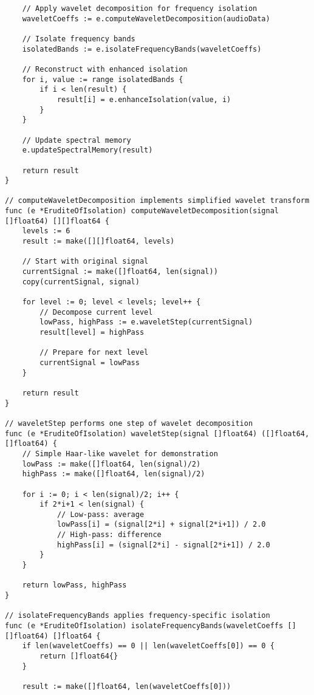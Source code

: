 \begin{tcolorbox}[colback=CodeBackground, colframe=DarkGray, title=Erudite of Isolation Implementation, fonttitle=\bfseries]
\begin{verbatim}
    // Apply wavelet decomposition for frequency isolation
    waveletCoeffs := e.computeWaveletDecomposition(audioData)
    
    // Isolate frequency bands
    isolatedBands := e.isolateFrequencyBands(waveletCoeffs)
    
    // Reconstruct with enhanced isolation
    for i, value := range isolatedBands {
        if i < len(result) {
            result[i] = e.enhanceIsolation(value, i)
        }
    }
    
    // Update spectral memory
    e.updateSpectralMemory(result)
    
    return result
}

// computeWaveletDecomposition implements simplified wavelet transform
func (e *EruditeOfIsolation) computeWaveletDecomposition(signal []float64) [][]float64 {
    levels := 6
    result := make([][]float64, levels)
    
    // Start with original signal
    currentSignal := make([]float64, len(signal))
    copy(currentSignal, signal)
    
    for level := 0; level < levels; level++ {
        // Decompose current level
        lowPass, highPass := e.waveletStep(currentSignal)
        result[level] = highPass
        
        // Prepare for next level
        currentSignal = lowPass
    }
    
    return result
}

// waveletStep performs one step of wavelet decomposition
func (e *EruditeOfIsolation) waveletStep(signal []float64) ([]float64, []float64) {
    // Simple Haar-like wavelet for demonstration
    lowPass := make([]float64, len(signal)/2)
    highPass := make([]float64, len(signal)/2)
    
    for i := 0; i < len(signal)/2; i++ {
        if 2*i+1 < len(signal) {
            // Low-pass: average
            lowPass[i] = (signal[2*i] + signal[2*i+1]) / 2.0
            // High-pass: difference
            highPass[i] = (signal[2*i] - signal[2*i+1]) / 2.0
        }
    }
    
    return lowPass, highPass
}

// isolateFrequencyBands applies frequency-specific isolation
func (e *EruditeOfIsolation) isolateFrequencyBands(waveletCoeffs [][]float64) []float64 {
    if len(waveletCoeffs) == 0 || len(waveletCoeffs[0]) == 0 {
        return []float64{}
    }
    
    result := make([]float64, len(waveletCoeffs[0]))
    

\end{verbatim}
\end{tcolorbox}
